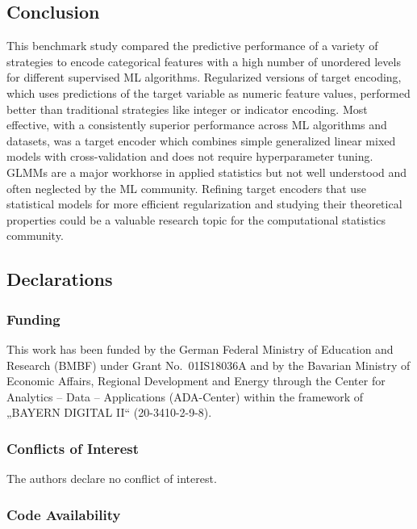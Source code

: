 \documentclass[smallextended]{svjour3}       %
\begin{document}
\hypertarget{conclusion}{%
\subsection{Conclusion}\label{conclusion}}

This benchmark study compared the predictive performance of a variety of strategies to encode categorical features with a high number of unordered levels for different supervised ML algorithms.
Regularized versions of target encoding, which uses predictions of the target variable as numeric feature values, performed better than traditional strategies like integer or indicator encoding.
Most effective, with a consistently superior performance across ML algorithms and datasets, was a target encoder which combines simple generalized linear mixed models with cross-validation and does not require hyperparameter tuning.
GLMMs are a major workhorse in applied statistics but not well understood and often neglected by the ML community.
Refining target encoders that use statistical models for more efficient regularization and studying their theoretical properties could be a valuable research topic for the computational statistics community.

\hypertarget{declarations}{%
\subsection{Declarations}\label{declarations}}

\hypertarget{funding}{%
\subsubsection{Funding}\label{funding}}

This work has been funded by the German Federal Ministry of Education and Research (BMBF) under Grant No.~01IS18036A and by the Bavarian Ministry of Economic Affairs, Regional Development and Energy through the Center for Analytics -- Data -- Applications (ADA-Center) within the framework of „BAYERN DIGITAL II`` (20-3410-2-9-8).

\hypertarget{conflicts-of-interest}{%
\subsubsection{Conflicts of Interest}\label{conflicts-of-interest}}

The authors declare no conflict of interest.

\hypertarget{code-availability}{%
\subsubsection{Code Availability}\label{code-availability}}
\end{document}
